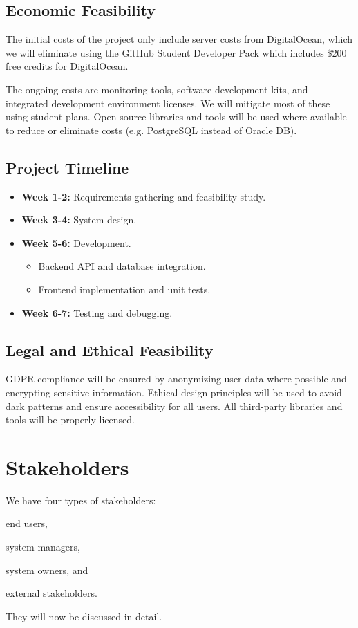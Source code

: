 \documentclass[a4paper,journal]{IEEEtran}
\begin{document}
\subsection{Economic Feasibility}
The initial costs of the project only include server costs from DigitalOcean,
which we will eliminate using the GitHub Student Developer Pack which includes
\$200 free credits for DigitalOcean.

The ongoing costs are monitoring tools, software development kits, and
integrated development environment licenses.
We will mitigate most of these using student plans.
Open-source libraries and tools will be used where available to reduce or
eliminate costs (e.g. PostgreSQL instead of Oracle DB).

\subsection{Project Timeline}
\begin{itemize}
  \item \textbf{Week 1-2:} Requirements gathering and feasibility study.
  \item \textbf{Week 3-4:} System design.
  \item \textbf{Week 5-6:} Development.
    \begin{itemize}
      \item Backend API and database integration.
      \item Frontend implementation and unit tests.
    \end{itemize}
  \item \textbf{Week 6-7:} Testing and debugging.
\end{itemize}

\subsection{Legal and Ethical Feasibility}
GDPR compliance will be ensured by anonymizing user data where possible and
encrypting sensitive information.
Ethical design principles will be used to avoid dark patterns and ensure
accessibility for all users.
All third-party libraries and tools will be properly licensed.

\section{Stakeholders}
We have four types of stakeholders:
\begin{enumerate*}
  \item end users,
  \item system managers,
  \item system owners, and
  \item external stakeholders.
\end{enumerate*}
They will now be discussed in detail.
\end{document}
